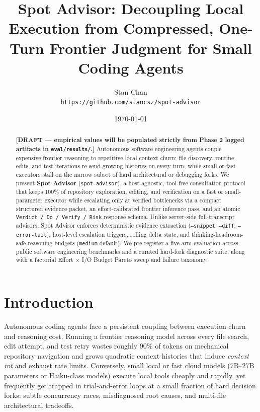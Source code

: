 \documentclass[11pt]{article}
\title{\textbf{Spot Advisor: Decoupling Local Execution from Compressed, One-Turn Frontier Judgment for Small Coding Agents}}
\author{
    Stan Chan \\
    \texttt{https://github.com/stancsz/spot-advisor}
}
\date{\today}
\begin{document}
\maketitle

\begin{abstract}
\textbf{[DRAFT --- empirical values will be populated strictly from Phase 2 logged artifacts in \texttt{eval/results/}.]}
Autonomous software engineering agents couple expensive frontier reasoning to repetitive local context churn: file discovery, routine edits, and test iterations re-send growing histories on every turn, while small or fast executors stall on the narrow subset of hard architectural or debugging forks. We present \textbf{Spot Advisor} (\texttt{spot-advisor}), a host-agnostic, tool-free consultation protocol that keeps 100\% of repository exploration, editing, and verification on a fast or small-parameter executor while escalating only at verified bottlenecks via a compact structured evidence packet, an effort-calibrated frontier inference pass, and an atomic \texttt{Verdict / Do / Verify / Risk} response schema. Unlike server-side full-transcript advisors, Spot Advisor enforces deterministic evidence extraction (\texttt{--snippet}, \texttt{--diff}, \texttt{--error-tail}), host-level escalation triggers, rolling delta state, and thinking-headroom-safe reasoning budgets (\texttt{medium} default). We pre-register a five-arm evaluation across public software engineering benchmarks and a curated hard-fork diagnostic suite, along with a factorial Effort $\times$ I/O Budget Pareto sweep and failure taxonomy.
\end{abstract}

\section{Introduction}
\label{sec:intro}

Autonomous coding agents face a persistent coupling between execution churn and reasoning cost. Running a frontier reasoning model across every file search, edit attempt, and test retry wastes roughly 90\% of tokens on mechanical repository navigation and grows quadratic context histories that induce \emph{context rot} and exhaust rate limits. Conversely, small local or fast cloud models ($7\text{B}\text{--}27\text{B}$ parameters or Haiku-class models) execute local tools cheaply and rapidly, yet frequently get trapped in trial-and-error loops at a small fraction of hard decision forks: subtle concurrency races, misdiagnosed root causes, and multi-file architectural tradeoffs.
\end{document}
